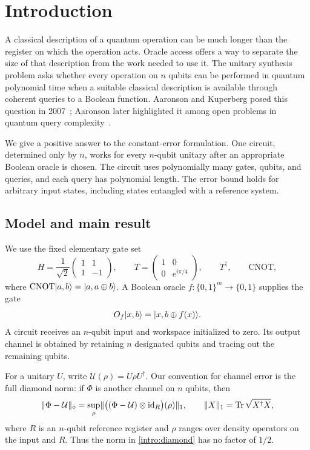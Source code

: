 \section{Introduction}\label{sec:introduction}
A classical description of a quantum operation can be much longer than the
register on which the operation acts.  Oracle access offers a way to separate
the size of that description from the work needed to use it.  The unitary
synthesis problem asks whether every operation on $n$ qubits can be performed
in quantum polynomial time when a suitable classical description is available
through coherent queries to a Boolean function.  Aaronson and Kuperberg posed
this question in 2007~\cite[Section~7, Problem~(4)]{AK2007}; Aaronson later
highlighted it among open problems in quantum query
complexity~\cite[Problem~6]{Aaronson2021}.

We give a positive answer to the constant-error formulation.  One circuit,
determined only by $n$, works for every $n$-qubit unitary after an appropriate
Boolean oracle is chosen.  The circuit uses polynomially many gates, qubits,
and queries, and each query has polynomial length.  The error bound holds for
arbitrary input states, including states entangled with a reference system.

\subsection{Model and main result}
We use the fixed elementary gate set
\[
 H=\frac1{\sqrt2}\begin{pmatrix}1&1\\1&-1\end{pmatrix},
 \qquad T=\begin{pmatrix}1&0\\0&e^{i\pi/4}\end{pmatrix},
 \qquad T^\dagger,\qquad \mathrm{CNOT},
\]
where $\mathrm{CNOT}\lvert a,b\rangle=\lvert a,a\oplus b\rangle$.  A Boolean oracle
$f:\{0,1\}^m\to\{0,1\}$ supplies the gate
\begin{equation}\label{intro:oracle}
 O_f\lvert x,b\rangle=\lvert x,b\oplus f(x)\rangle.
\end{equation}
A circuit receives an $n$-qubit input and workspace initialized to zero.  Its
output channel is obtained by retaining $n$ designated qubits and tracing out
the remaining qubits.

For a unitary $U$, write $\mathcal U(\rho)=U\rho U^\dagger$.  Our convention for
channel error is the full diamond norm: if $\Phi$ is another channel on $n$
qubits, then
\begin{equation}\label{intro:diamond}
 \lVert \Phi-\mathcal U\rVert_\diamond
 =\sup_{\rho}\lVert \bigl((\Phi-\mathcal U)\otimes\mathrm{id}_R\bigr)(\rho)\rVert_1,
 \qquad \lVert X\rVert_1=\operatorname{Tr}\sqrt{X^\dagger X},
\end{equation}
where $R$ is an $n$-qubit reference register and $\rho$ ranges over density
operators on the input and $R$.  Thus the norm in
\eqref{intro:diamond} has no factor of $1/2$.

